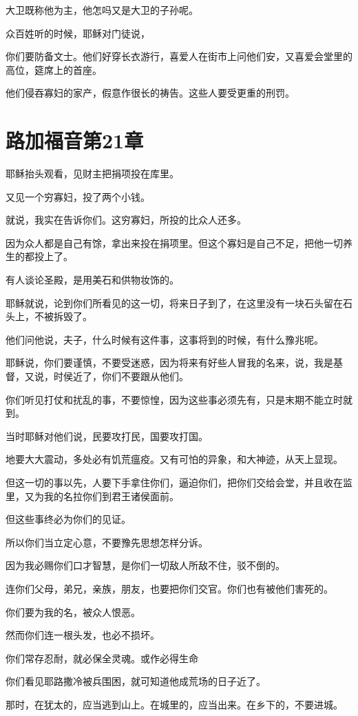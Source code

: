 \documentclass[12pt,oneside]{book}
\begin{document}
大卫既称他为主，他怎吗又是大卫的子孙呢。

众百姓听的时候，耶稣对门徒说，

你们要防备文士。他们好穿长衣游行，喜爱人在街市上问他们安，又喜爱会堂里的高位，筵席上的首座。

他们侵吞寡妇的家产，假意作很长的祷告。这些人要受更重的刑罚。

\chapter{路加福音第21章}
耶稣抬头观看，见财主把捐项投在库里。

又见一个穷寡妇，投了两个小钱。

就说，我实在告诉你们。这穷寡妇，所投的比众人还多。

因为众人都是自己有馀，拿出来投在捐项里。但这个寡妇是自己不足，把他一切养生的都投上了。

有人谈论圣殿，是用美石和供物妆饰的。

耶稣就说，论到你们所看见的这一切，将来日子到了，在这里没有一块石头留在石头上，不被拆毁了。

他们问他说，夫子，什么时候有这件事，这事将到的时候，有什么豫兆呢。

耶稣说，你们要谨慎，不要受迷惑，因为将来有好些人冒我的名来，说，我是基督，又说，时侯近了，你们不要跟从他们。

你们听见打仗和扰乱的事，不要惊惶，因为这些事必须先有，只是末期不能立时就到。

当时耶稣对他们说，民要攻打民，国要攻打国。

地要大大震动，多处必有饥荒瘟疫。又有可怕的异象，和大神迹，从天上显现。

但这一切的事以先，人要下手拿住你们，逼迫你们，把你们交给会堂，并且收在监里，又为我的名拉你们到君王诸侯面前。

但这些事终必为你们的见证。

所以你们当立定心意，不要豫先思想怎样分诉。

因为我必赐你们口才智慧，是你们一切敌人所敌不住，驳不倒的。

连你们父母，弟兄，亲族，朋友，也要把你们交官。你们也有被他们害死的。

你们要为我的名，被众人恨恶。

然而你们连一根头发，也必不损坏。

你们常存忍耐，就必保全灵魂。或作必得生命

你们看见耶路撒冷被兵围困，就可知道他成荒场的日子近了。

那时，在犹太的，应当逃到山上。在城里的，应当出来。在乡下的，不要进城。
\end{document}
